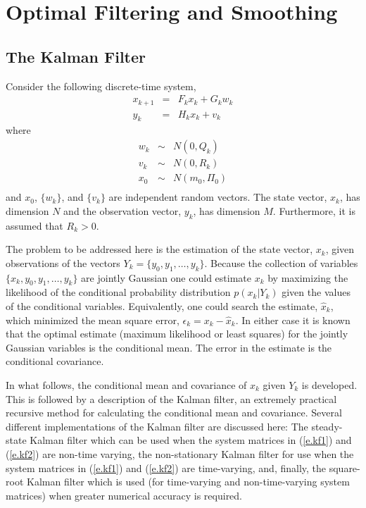 
\chapter{Optimal Filtering and Smoothing}

\section{The Kalman Filter}

	Consider the following discrete-time system,
%
\begin{eqnarray}
x_{k+1}&=&F_kx_k+G_kw_k\nonumber\\
y_k&=&H_kx_k+v_k
\label{e.kf1}
\end{eqnarray}
%
where
%
\begin{eqnarray}
w_k&\sim&N(0,Q_k)\nonumber\\
v_k&\sim&N(0,R_k)\nonumber\\
x_0&\sim&N(m_0,\Pi_0)\nonumber\\
\label{e.kf1a}
\end{eqnarray}
%
and $x_0$, $\{w_k\}$, and $\{v_k\}$ are independent random vectors.
The state vector, $x_k$, has dimension $N$ and the observation
vector, $y_k$, has dimension $M$.  Furthermore, it is assumed that
$R_k>0$.

	The problem to be addressed here is the estimation
of the state vector, $x_k$, given observations of the vectors
$Y_k=\{y_0,y_1,\ldots,y_k\}$.  Because the collection of variables
$\{x_k,y_0,y_1,\ldots,y_k\}$ are jointly Gaussian 
one could estimate $x_k$ by maximizing the likelihood
of the conditional probability distribution $p(x_k|Y_k)$
given the values of the conditional variables.  Equivalently,
one could search the estimate, $\hat{x}_k$, which minimized the
mean square error, $\epsilon_k=x_k-\hat{x}_k$.  In either case it
is known that the optimal estimate (maximum likelihood or least
squares) for the jointly Gaussian variables is the conditional mean.
The error in the estimate is the conditional covariance.

	In what follows, the conditional mean and covariance
of $x_k$ given $Y_k$ is developed.  This is followed by
a description of the Kalman filter, an extremely practical
recursive method for calculating the conditional mean and covariance.
Several different implementations of the Kalman filter are discussed
here:  The steady-state Kalman filter which can be used when
the system matrices in (\ref{e.kf1}) and (\ref{e.kf2}) are non-time varying, 
the non-stationary Kalman filter for use when the system matrices in
(\ref{e.kf1}) and (\ref{e.kf2}) 
are time-varying, and, finally, the square-root
Kalman filter which is used (for time-varying and non-time-varying
system matrices) when greater numerical accuracy is required.

